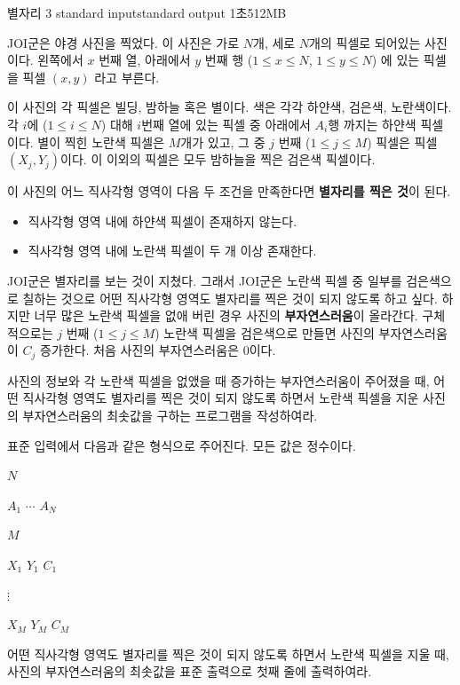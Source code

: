 \begin{problem}{별자리 3}
	{standard input}{standard output}
	{1초}{512MB}{}
	
	JOI군은 야경 사진을 찍었다. 이 사진은 가로 $N$개, 세로 $N$개의 픽셀로 되어있는 사진이다. 왼쪽에서 $x$ 번째 열, 아래에서 $y$ 번째 행 ($1 \le x \le N$, $1 \le y \le N$) 에 있는 픽셀을 픽셀 $(x, y)$ 라고 부른다.
	
	이 사진의 각 픽셀은 빌딩, 밤하늘 혹은 별이다. 색은 각각 하얀색, 검은색, 노란색이다. 각 $i$에 ($1 \le i \le N$) 대해 $i$번째 열에 있는 픽셀 중 아래에서 $A_i$행 까지는 하얀색 픽셀이다. 별이 찍힌 노란색 픽셀은 $M$개가 있고, 그 중 $j$ 번째 ($1 \le j \le M$) 픽셀은 픽셀 $(X_j, Y_j)$이다. 이 이외의 픽셀은 모두 밤하늘을 찍은 검은색 픽셀이다.
	
	이 사진의 어느 직사각형 영역이 다음 두 조건을 만족한다면 \textbf{별자리를 찍은 것}이 된다.
	
	\begin{itemize}
		\item 직사각형 영역 내에 하얀색 픽셀이 존재하지 않는다.
		\item 직사각형 영역 내에 노란색 픽셀이 두 개 이상 존재한다.
	\end{itemize}

	JOI군은 별자리를 보는 것이 지쳤다. 그래서 JOI군은 노란색 픽셀 중 일부를 검은색으로 칠하는 것으로 어떤 직사각형 영역도 별자리를 찍은 것이 되지 않도록 하고 싶다. 하지만 너무 많은 노란색 픽셀을 없애 버린 경우 사진의 \textbf{부자연스러움}이 올라간다. 구체적으로는 $j$ 번째 ($1 \le j \le M$) 노란색 픽셀을 검은색으로 만들면 사진의 부자연스러움이 $C_j$ 증가한다. 처음 사진의 부자연스러움은 0이다.
	
	사진의 정보와 각 노란색 픽셀을 없앴을 때 증가하는 부자연스러움이 주어졌을 때, 어떤 직사각형 영역도 별자리를 찍은 것이 되지 않도록 하면서 노란색 픽셀을 지운 사진의 부자연스러움의 최솟값을 구하는 프로그램을 작성하여라.
	
	
\InputFile

표준 입력에서 다음과 같은 형식으로 주어진다. 모든 값은 정수이다.

$N$ 

$A_1$ $\cdots$ $A_N$

$M$

$X_1$ $Y_1$ $C_1$

$\vdots$

$X_M$ $Y_M$ $C_M$

\OutputFile

어떤 직사각형 영역도 별자리를 찍은 것이 되지 않도록 하면서 노란색 픽셀을 지울 때, 사진의 부자연스러움의 최솟값을 표준 출력으로 첫째 줄에 출력하여라.


\end{problem}

